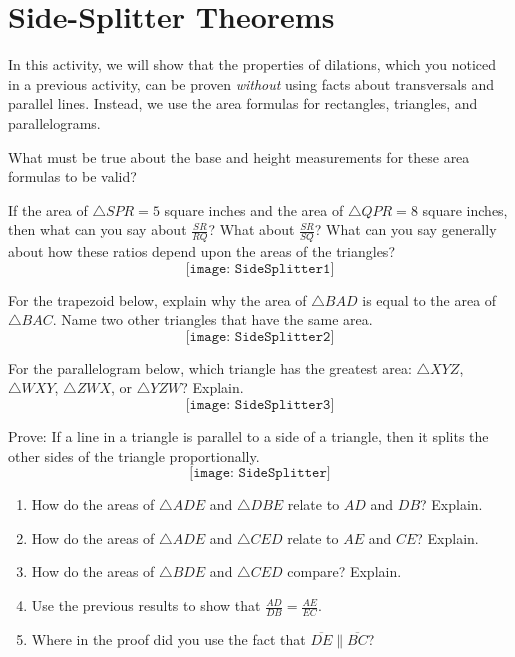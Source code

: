 \newpage

\section{Side-Splitter Theorems}
In this activity, we will show that the properties of dilations, which you noticed in a previous activity, can be proven \emph{without} using facts about transversals and parallel lines.  Instead, we use the area formulas for rectangles, triangles, and parallelograms.  
\begin{question}
What must be true about the base and height measurements for these area formulas to be valid? 
\end{question}


\begin{prob}
If the area of $\triangle SPR = 5$ square inches and the area of $\triangle QPR = 8$ square inches, then what can you say about $\frac{SR}{RQ}$?  What about $\frac{SR}{SQ}$?  What can you say generally about how these ratios depend upon the areas of the triangles?  
$$\texttt{[image: SideSplitter1]}$$
\end{prob}

\begin{prob}
For the trapezoid below, explain why the area of $\triangle BAD$ is equal to the area of $\triangle BAC$.  Name two other triangles that have the same area.
$$\texttt{[image: SideSplitter2]}$$
\end{prob}

\begin{prob}
For the parallelogram below, which triangle has the greatest area: $\triangle XYZ$, $\triangle WXY$, $\triangle ZWX$, or $\triangle YZW$?  Explain.  
$$\texttt{[image: SideSplitter3]}$$
\end{prob}

\begin{prob}
Prove:  If a line in a triangle is parallel to a side of a triangle, then it splits the other sides of the triangle proportionally.
$$\texttt{[image: SideSplitter]}$$
\begin{enumerate}
\item How do the areas of $\triangle ADE$ and $\triangle DBE$ relate to $AD$ and $DB$?  Explain.  
\item How do the areas of $\triangle ADE$ and $\triangle CED$ relate to $AE$ and $CE$?  Explain. 
\item How do the areas of $\triangle BDE$ and $\triangle CED$ compare?  Explain.  
\item Use the previous results to show that $\frac{AD}{DB} = \frac{AE}{EC}$.  
\item Where in the proof did you use the fact that $\overline{DE} \parallel \overline{BC}$?  
\end{enumerate}
\end{prob}

